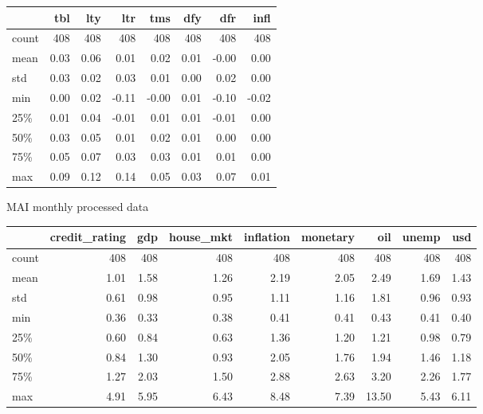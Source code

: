 \documentclass{article}
\begin{document}
\bigskip
\begin{tabular}{lrrrrrrr}
\toprule
{} &   tbl &   lty &   ltr &   tms &   dfy &   dfr &  infl \\
\midrule
count &  408 &  408 &  408 &  408 &  408 &  408 &  408 \\
mean  &    0.03 &    0.06 &    0.01 &    0.02 &    0.01 &   -0.00 &    0.00 \\
std   &    0.03 &    0.02 &    0.03 &    0.01 &    0.00 &    0.02 &    0.00 \\
min   &    0.00 &    0.02 &   -0.11 &   -0.00 &    0.01 &   -0.10 &   -0.02 \\
25\%   &    0.01 &    0.04 &   -0.01 &    0.01 &    0.01 &   -0.01 &    0.00 \\
50\%   &    0.03 &    0.05 &    0.01 &    0.02 &    0.01 &    0.00 &    0.00 \\
75\%   &    0.05 &    0.07 &    0.03 &    0.03 &    0.01 &    0.01 &    0.00 \\
max   &    0.09 &    0.12 &    0.14 &    0.05 &    0.03 &    0.07 &    0.01 \\
\bottomrule
\end{tabular}

\newline


\bigskip
MAI monthly processed data

\begin{tabular}{lrrrrrrrr}
\toprule
{} &  credit\_rating &   gdp &  house\_mkt &  inflation &  monetary &   oil &  unemp &   usd \\
\midrule
count &           408 & 408 &     408 &     408 &    408 & 408 & 408 & 408 \\
mean  &             1.01 &   1.58 &       1.26 &       2.19 &      2.05 &   2.49 &   1.69 &   1.43 \\
std   &             0.61 &   0.98 &       0.95 &       1.11 &      1.16 &   1.81 &   0.96 &   0.93 \\
min   &             0.36 &   0.33 &       0.38 &       0.41 &      0.41 &   0.43 &   0.41 &   0.40 \\
25\%   &             0.60 &   0.84 &       0.63 &       1.36 &      1.20 &   1.21 &   0.98 &   0.79 \\
50\%   &             0.84 &   1.30 &       0.93 &       2.05 &      1.76 &   1.94 &   1.46 &   1.18 \\
75\%   &             1.27 &   2.03 &       1.50 &       2.88 &      2.63 &   3.20 &   2.26 &   1.77 \\
max   &             4.91 &   5.95 &       6.43 &       8.48 &      7.39 &  13.50 &   5.43 &   6.11 \\
\bottomrule
\end{tabular}
\end{document}
